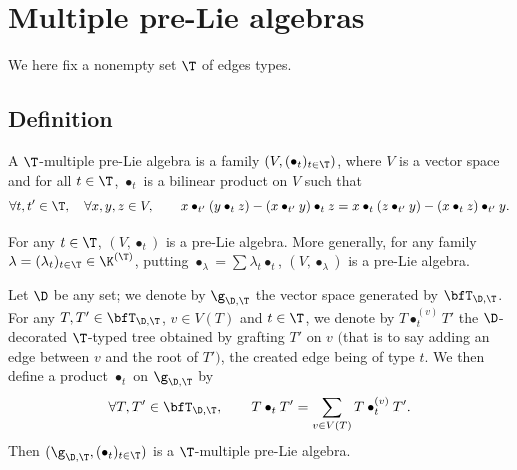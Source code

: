 \section{Multiple pre-Lie algebras}

We here fix a nonempty set $\T$ of edges types.

\subsection{Definition}

\begin{Definition} \label{defi3}
A $\T$-multiple pre-Lie algebra is a family $(V,(\bullet_t)_{t\in \T})$,
where $V$ is a vector space and for all $t\in \T$,
$\bullet_t$ is a bilinear product on $V$ such that
\begin{gather*}
\forall t,t'\in \T,\quad\forall x,y,z\in V,\qquad
x\bullet_{t'}(y \bullet_t z)-(x\bullet_{t'} y)\bullet_t z=x\bullet_t(z \bullet_{t'} y)-(x\bullet_t z)\bullet_{t'} y.
\end{gather*}
\end{Definition}

\begin{Remark}
For any $t\in \T$, $(V,\bullet_t)$ is a pre-Lie algebra.
More generally, for any family $\lambda=(\lambda_t)_{t\in \T}\in \K^{(\T)}$,
putting $\bullet_\lambda=\sum \lambda_t \bullet_t$, $(V,\bullet_\lambda)$ is a pre-Lie algebra.
\end{Remark}

\begin{Proposition}
Let $\D$ be any set; we denote by $\g_{\D,\T}$ the vector space generated by $\bfT_{\D,\T}$.
For any $T,T'\in \bfT_{\D,\T}$,
$v\in V(T)$ and $t\in \T$, we denote by $T\bullet_t^{(v)} T'$ the $\D$-decorated $\T$-typed tree
obtained by grafting $T'$ on $v$ $($that is to say adding an edge between $v$ and the root of $T')$, the created edge being of type $t$.
We then define a product $\bullet_t$ on $\g_{\D,\T}$ by
\begin{gather*}
\forall T,T'\in \bfT_{\D,\T},\qquad
T\bullet_t T'=\sum_{v\in V(T)} T\bullet_t^{(v)} T'.
\end{gather*}
Then $(\g_{\D,\T},(\bullet_t)_{t\in \T})$ is a $\T$-multiple pre-Lie algebra.
\end{Proposition}

